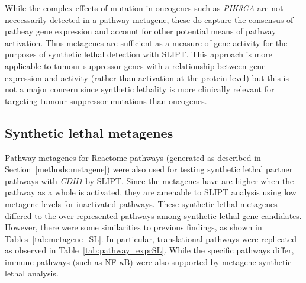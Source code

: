  While the complex effects of mutation in oncogenes such as \textit{PIK3CA} are not neccessarily detected in a pathway metagene, these do capture the consensus of patheay gene expression and account for other potential means of pathway activation. Thus metagenes are sufficient as a measure of gene activity for the purposes of synthetic lethal detection with \gls{SLIPT}. This approach is more applicable to tumour suppressor genes with a relationship between gene expression and activity (rather than activation at the protein level) but this is not a major concern since synthetic lethality is more clinically relevant for targeting tumour suppressor mutations than oncogenes.

\FloatBarrier

\subsection{Synthetic lethal metagenes} \label{chapt3:metagene_SL}

Pathway metagenes for Reactome pathways (generated as described in Section~\ref{methods:metagene}) were also used for testing synthetic lethal partner pathways with \textit{CDH1} by \gls{SLIPT}. Since the metagenes have are higher when the pathway as a whole is activated, they are amenable to \gls{SLIPT} analysis using low metagene levels for inactivated pathways. These synthetic lethal metagenes differed to the over-represented pathways among synthetic lethal gene candidates. However, there were some similarities to previous findings, as shown in Tables~\ref{tab:metagene_SL}. In particular, translational pathways were replicated as observed in Table~\ref{tab:pathway_exprSL}. While the specific pathways differ, immune pathways (such as NF-$\kappa$B) were also supported by metagene synthetic lethal analysis.

